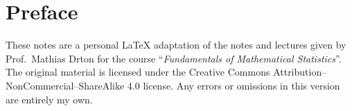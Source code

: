 \documentclass[12pt]{book}
\begin{document}
    
    \chapter*{Preface}
    \label{cha:Preface}
These notes are a personal LaTeX adaptation of the notes and lectures given  
by Prof.\ Mathias Drton 
for the course
``\textit{Fundamentals of Mathematical Statistics}''.
The original material is licensed under the
Creative Commons Attribution–NonCommercial–ShareAlike 4.0 license.
Any errors or omissions in this version are entirely my own.

    
    
    
    
    
    
    
    
    
    
    
    
    
    
\end{document}
